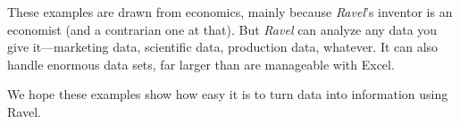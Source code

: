 These examples are drawn from economics, mainly because \emph{Ravel}'s
inventor is an economist (and a contrarian one at that). But \emph{Ravel}
can analyze any data you give it---marketing data, scientific data,
production data, whatever. It can also handle enormous data sets,
far larger than are manageable with Excel.

We hope these examples show how easy it is to turn data into information
using Ravel.
